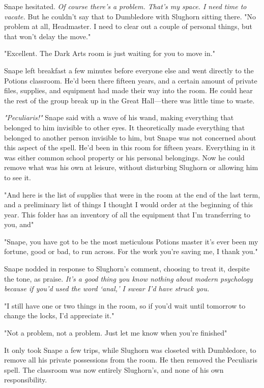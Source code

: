 Snape hesitated. \emph{Of course there's a problem. That's my space. I need time to vacate.} But he couldn't say that to Dumbledore with Slughorn sitting there. "No problem at all, Headmaster. I need to clear out a couple of personal things, but that won't delay the move."

"Excellent. The Dark Arts room is just waiting for you to move in."

Snape left breakfast a few minutes before everyone else and went directly to the Potions classroom. He'd been there fifteen years, and a certain amount of private files, supplies, and equipment had made their way into the room. He could hear the rest of the group break up in the Great Hall—there was little time to waste.

\emph{"Peculiaris!"} Snape said with a wave of his wand, making everything that belonged to him invisible to other eyes. It theoretically made everything that belonged to another person invisible to him, but Snape was not concerned about this aspect of the spell. He'd been in this room for fifteen years. Everything in it was either common school property or his personal belongings. Now he could remove what was his own at leisure, without disturbing Slughorn or allowing him to see it.

\sbreak

"And here is the list of supplies that were in the room at the end of the last term, and a preliminary list of things I thought I would order at the beginning of this year. This folder has an inventory of all the equipment that I'm transferring to you, and{\el}"

"Snape, you have got to be the most meticulous Potions master it's ever been my fortune, good or bad, to run across. For the work you're saving me, I thank you."

Snape nodded in response to Slughorn's comment, choosing to treat it, despite the tone, as praise. \emph{It's a good thing you know nothing about modern psychology because if you'd used the word `anal,' I swear I'd have struck you.}

"I still have one or two things in the room, so if you'd wait until tomorrow to change the locks, I'd appreciate it."

"Not a problem, not a problem. Just let me know when you're finished{\el}"

It only took Snape a few trips, while Slughorn was closeted with Dumbledore, to remove all his private possessions from the room. He then removed the Peculiaris spell. The classroom was now entirely Slughorn's, and none of his own responsibility.

